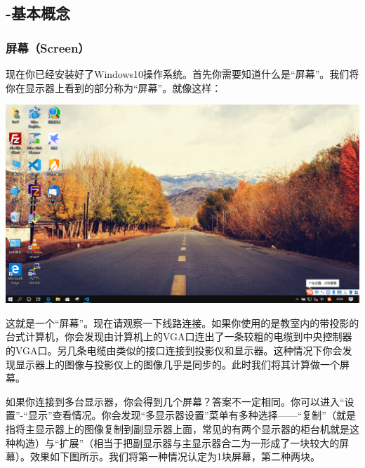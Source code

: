 \subsection{-基本概念}
\subsubsection{屏幕（Screen）}
现在你已经安装好了Windows10操作系统。首先你需要知道什么是“屏幕”。我们将你在显示器上看到的部分称为“屏幕”。就像这样：
\begin{center}
	\includegraphics[scale=0.25]{pic/screen}
\end{center} \par
这就是一个“屏幕”。现在请观察一下线路连接。如果你使用的是教室内的带投影的台式计算机，你会发现由计算机上的VGA口连出了一条较粗的电缆到中央控制器的VGA口。另几条电缆由类似的接口连接到投影仪和显示器。这种情况下你会发现显示器上的图像与投影仪上的图像几乎是同步的。此时我们将其计算做一个屏幕。\par
如果你连接到多台显示器，你会得到几个屏幕？答案不一定相同。你可以进入“设置”-“显示”查看情况。你会发现“多显示器设置”菜单有多种选择——“复制”（就是指将主显示器上的图像复制到副显示器上面，常见的有两个显示器的柜台机就是这种构造）与“扩展”（相当于把副显示器与主显示器合二为一形成了一块较大的屏幕）。效果如下图所示。我们将第一种情况认定为1块屏幕，第二种两块。
